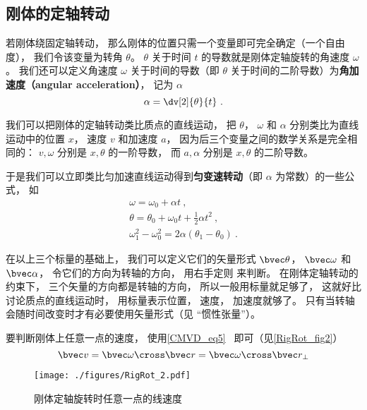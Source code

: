

\subsection{刚体的定轴转动}
若刚体绕固定轴转动， 那么刚体的位置只需一个变量即可完全确定（一个自由度）， 我们令该变量为转角 $\theta$。 $\theta$ 关于时间 $t$ 的导数就是刚体定轴旋转的角速度 $\omega$。 我们还可以定义角速度 $\omega$ 关于时间的导数（即 $\theta$ 关于时间的二阶导数）为\textbf{角加速度（angular acceleration）}， 记为 $\alpha$
\begin{equation}
\alpha = \dv[2]{\theta}{t}~.
\end{equation}

我们可以把刚体的定轴转动类比质点的直线运动， 把 $\theta$， $\omega$ 和 $\alpha$ 分别类比为直线运动中的位置 $x$， 速度 $v$ 和加速度 $a$， 因为后三个变量之间的数学关系是完全相同的： $v, \omega$ 分别是 $x, \theta$ 的一阶导数， 而 $a, \alpha$ 分别是 $x, \theta$ 的二阶导数。

于是我们可以立即类比匀加速直线运动得到\textbf{匀变速转动}（即 $\alpha$ 为常数）的一些公式， 如
\begin{gather}
\omega = \omega_0 + \alpha t~,\\
\theta = \theta_0 + \omega_0 t + \frac12 \alpha t^2~,\\
\omega_1^2 - \omega_0^2 = 2\alpha (\theta_1-\theta_0)~.
\end{gather}

在以上三个标量的基础上， 我们可以定义它们的矢量形式 $\bvec \theta$， $\bvec \omega$ 和 $\bvec \alpha$， 令它们的方向为转轴的方向， 用右手定则 来判断。 在刚体定轴转动的约束下， 三个矢量的方向都是转轴的方向， 所以一般用标量就足够了， 这就好比讨论质点的直线运动时， 用标量表示位置， 速度， 加速度就够了。 只有当转轴会随时间改变时才有必要使用矢量形式（见 “惯性张量”）。

要判断刚体上任意一点的速度， 使用\autoref{CMVD_eq5}~ 即可（见\autoref{RigRot_fig2}）
\begin{equation}
\bvec v = \bvec \omega \cross \bvec r = \bvec \omega \cross \bvec r_\bot
\end{equation}

\begin{figure}[ht]
\centering
\texttt{[image: ./figures/RigRot\_2.pdf]}
\caption{刚体定轴旋转时任意一点的线速度} \label{RigRot_fig2}
\end{figure}

